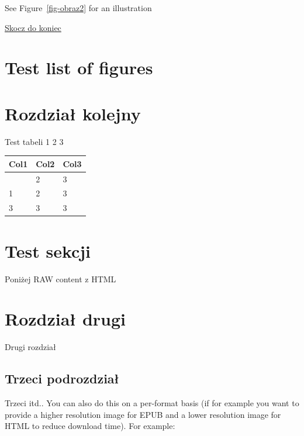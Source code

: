 \documentclass[
  a4paper,
  DIV=11,
  numbers=noendperiod,
  oneside,
  open=any]{scrreprt}
\begin{document}
See Figure~\ref{fig-obraz2} for an illustration

\hyperref[koniec]{Skocz do koniec}

\section{Test list of figures}\label{test-list-of-figures}

\listoffigures

\section{Rozdział kolejny}\label{rozdziaux142-kolejny}

Test tabeli 1 2 3

\begin{longtable}[]{@{}lll@{}}
\toprule\noalign{}
Col1 & Col2 & Col3 \\
\midrule\noalign{}
\endhead
\bottomrule\noalign{}
\endlastfoot
1 & 2 & 3 \\
1 & 2 & 3 \\
3 & 3 & 3 \\
\end{longtable}

\section{Test sekcji}\label{test-sekcji}

Poniżej RAW content z HTML

\section{Rozdział drugi}\label{rozdziaux142-drugi}

Drugi rozdział

\subsection{Trzeci podrozdział}\label{trzeci-podrozdziaux142}

Trzeci itd.. You can also do this on a per-format basis (if for example
you want to provide a higher resolution image for EPUB and a lower
resolution image for HTML to reduce download time). For example:

{}
\end{document}
